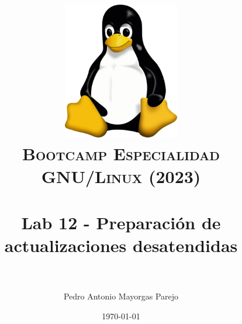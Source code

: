 

\graphicspath{ {img/} }

\title{
\normalfont \normalsize
\includegraphics[width=6cm,height=6cm]{logo}\\
\textsc{\textbf{Bootcamp Especialidad GNU/Linux (2023)}} \\ [25pt] %
\horrule{0.5pt} \\[0.4cm] %
\huge Lab 12 - Preparación de actualizaciones desatendidas \\ %
\horrule{2pt} \\[0.5cm] %
}

\author{Pedro Antonio Mayorgas Parejo} %

\date{\normalsize\today} %




\maketitle %

\newpage %

\tableofcontents %

\newpage


